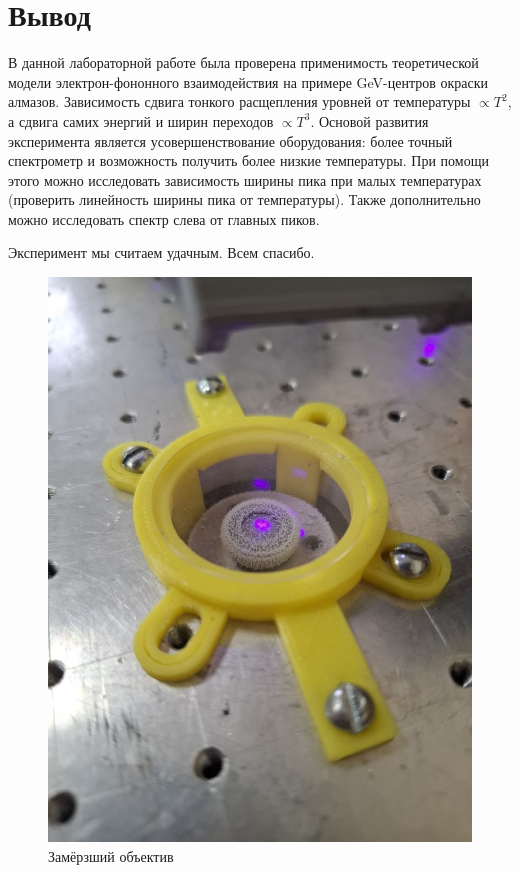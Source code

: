 \section{Вывод}
В данной лабораторной работе была проверена применимость
теоретической модели электрон-фононного взаимодействия 
на примере GeV-центров окраски алмазов. 
Зависимость сдвига тонкого расщепления уровней от температуры 
$\propto T^2$, а сдвига самих энергий и ширин переходов $\propto T^3$.
Основой развития эксперимента является усовершенствование оборудования:
более точный спектрометр и возможность получить более низкие
температуры. При помощи этого можно исследовать
зависимость ширины пика при малых температурах (проверить линейность
ширины пика от температуры). Также дополнительно можно исследовать 
спектр слева от главных пиков.

Эксперимент мы считаем удачным. Всем спасибо.

\begin{figure}[!h]
    \begin{center}
        \includegraphics[width=0.5 \linewidth]{Beautiful.jpg}
        \caption{Замёрзший объектив}
        \label{Beautiful}
    \end{center}
\end{figure}